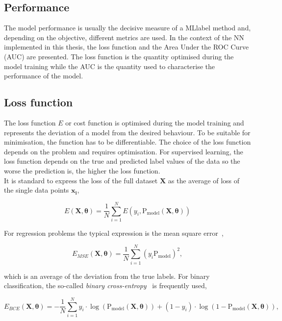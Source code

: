 \subsection{Performance}

The model performance is usually the decisive measure of a \acrshort{MLlabel} method and, depending on the objective, different metrics are used. In the context of the NN implemented in this thesis, the loss function and the Area Under the ROC Curve (AUC) are presented. The loss function is the quantity optimised during the model training while the AUC is the quantity used to characterise the performance of the model.

\subsection{Loss function}

The loss function $E$ or cost function is optimised during the model training and represents the deviation of a model from the desired behaviour. To be suitable for minimisation, the function has to be differentiable. The choice of the loss function depends on the problem and requires optimisation. For supervised learning, the loss function depends on the true and predicted label values of the data so the worse the prediction is, the higher the loss function.\\

It is standard to express the loss of the full dataset $\mathbf{X}$ as the average of loss of the single data points $\mathbf{x_i}$,

\begin{equation}
    E(\mathbf{X},\boldsymbol{\theta})=\frac{1}{N}\sum_{i=1}^NE(y_i,\text{P}_\text{model}(\mathbf{X},\boldsymbol{\theta}))
\end{equation}

For regression problems the typical expression is the mean square error~\cite{EncyclopediaofML}, 

\begin{equation}
    E_{MSE}(\mathbf{X},\boldsymbol{\theta}) = \frac{1}{N}\sum_{i=1}^N (y_i\text{P}_\text{model})^2,
\end{equation}

which is an average of the deviation from the true labels. For binary classification, the so-called \textit{binary cross-entropy}~\cite{binarycross} is frequently used, 

\begin{equation}
    E_{BCE}(\mathbf{X},\boldsymbol{\theta}) = -\frac{1}{N}\sum_{i=1}^N y_i\cdot\log(\text{P}_\text{model}(\mathbf{X},\boldsymbol{\theta}))+(1-y_i)\cdot\log(1-\text{P}_\text{model}(\mathbf{X},\mathbf{\theta})),
\end{equation}

